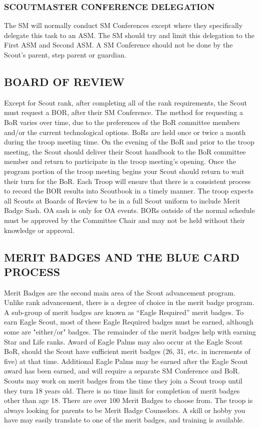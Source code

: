 \documentclass{ltxguide}
\begin{document}
\subsubsection{SCOUTMASTER CONFERENCE DELEGATION}
The \ac{SM} will normally conduct \ac{SM} Conferences except where they specifically delegate this task to an \ac{ASM}. The \ac{SM} should try and limit this delegation to the First \ac{ASM} and Second \ac{ASM}. A \ac{SM} Conference should not be done by the Scout's parent, step parent or guardian.

\subsection{BOARD OF REVIEW}
Except for Scout rank, after completing all of the rank requirements, the Scout must request a \ac{BOR}, after their \ac{SM} Conference. The method for requesting a \ac{BoR} varies over time, due to the preferences of the \ac{BoR} committee members and/or the current technological options. \acp{BoR} are held once or twice a month during the troop meeting time. On the evening of the \ac{BoR} and prior to the troop meeting, the Scout should deliver their Scout handbook  to the \ac{BoR} committee member and return to participate in the troop meeting's opening. Once the program portion of the troop meeting begins your Scout should return to wait their turn for the \ac{BoR}. Each Troop will ensure that there is a consistent process to record the BOR results into Scoutbook in a timely manner. The troop expects all Scouts at Boards  of Review to be in a full Scout uniform to include Merit Badge Sash. OA sash is only for OA events. BORs outside of the normal schedule must be approved by the Committee Chair and may not be held without their knowledge or approval.

\subsection{MERIT BADGES AND THE BLUE CARD PROCESS}
Merit Badges are the second main area of the Scout advancement program. Unlike rank advancement, there is a degree of choice in the merit badge program. A sub-group of merit badges are known as “Eagle Required” merit badges. To earn Eagle Scout, most of these Eagle Required badges must be earned, although some are "either/or" badges. The remainder of the merit badges help with earning Star and Life ranks. Award of Eagle Palms may also occur at the Eagle Scout \ac{BoR}, should the Scout have sufficient merit badges (26, 31, etc. in increments of five) at that time. Additional Eagle Palms may be earned after the Eagle Scout award has been earned, and will require a separate \ac{SM} Conference and \ac{BoR}. Scouts may work on merit badges from the time they join a Scout troop until they turn 18 years old. There is no time limit for completion of merit badges other than age 18. There are over 100         Merit Badges to choose from. The troop is always looking for parents to be Merit Badge Counselors. A skill or hobby you have may easily translate to one of the merit badges, and training is available.
\end{document}
